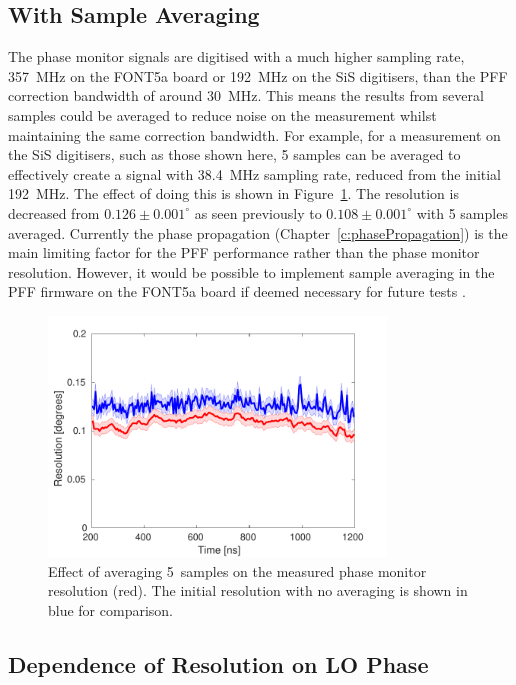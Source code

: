 \subsection{With Sample Averaging}
\label{ss:resCalAlongPulse}

The phase monitor signals are digitised with a much higher sampling rate, 357~MHz on the FONT5a board or 192~MHz on the SiS digitisers, than the PFF correction bandwidth of around 30~MHz. This means the results from several samples could be averaged to reduce noise on the measurement whilst maintaining the same correction bandwidth. For example, for a measurement on the SiS digitisers, such as those shown here, 5 samples can be averaged to effectively create a signal with 38.4~MHz sampling rate, reduced from the initial 192~MHz. The effect of doing this is shown in Figure~\ref{f:resolutionWithAveraging}. The resolution is decreased from \(0.126\pm0.001^\circ\) as seen previously to \(0.108\pm0.001^\circ\) with 5 samples averaged. Currently the phase propagation (Chapter~\ref{c:phasePropagation}) is the main limiting factor for the PFF performance rather than the phase monitor resolution. However, it would be possible to implement sample averaging in the PFF firmware on the FONT5a board if deemed necessary for future tests \cite{glennPriv}.

\begin{figure}
  \centering
  \includegraphics[width=0.8\textwidth]{Figures/phaseMons/resolutionWithAveraging}
  \caption{Effect of averaging 5~samples on the measured phase monitor resolution (red). The initial resolution with no averaging is shown in blue for comparison.}
  \label{f:resolutionWithAveraging}
\end{figure}


\subsection{Dependence of Resolution on LO Phase}
\label{ss:resVsShifter}

